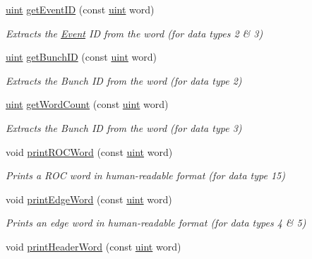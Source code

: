 \begin{DoxyCompactItemize}
\hyperlink{namespacebindec_a61700e6ffcfc677215bfdf223803e735}{uint} \hyperlink{namespacebindec_a7164db2f87d4d2cfa12b2cd147d2402d}{get\+Event\+ID} (const \hyperlink{namespacebindec_a61700e6ffcfc677215bfdf223803e735}{uint} word)
\begin{DoxyCompactList}\small\item\em Extracts the \hyperlink{class_event}{Event} ID from the word (for data types 2 \& 3) \end{DoxyCompactList}\item 
\hyperlink{namespacebindec_a61700e6ffcfc677215bfdf223803e735}{uint} \hyperlink{namespacebindec_ad029aeb7b485d578e5f3ce91a9cf85f6}{get\+Bunch\+ID} (const \hyperlink{namespacebindec_a61700e6ffcfc677215bfdf223803e735}{uint} word)
\begin{DoxyCompactList}\small\item\em Extracts the Bunch ID from the word (for data type 2) \end{DoxyCompactList}\item 
\hyperlink{namespacebindec_a61700e6ffcfc677215bfdf223803e735}{uint} \hyperlink{namespacebindec_a41cf9d8a7714d845128193f21a9e8947}{get\+Word\+Count} (const \hyperlink{namespacebindec_a61700e6ffcfc677215bfdf223803e735}{uint} word)
\begin{DoxyCompactList}\small\item\em Extracts the Bunch ID from the word (for data type 3) \end{DoxyCompactList}\item 
void \hyperlink{namespacebindec_ae47ffd422cb9936f6dfca77bc7c969cb}{print\+R\+O\+C\+Word} (const \hyperlink{namespacebindec_a61700e6ffcfc677215bfdf223803e735}{uint} word)
\begin{DoxyCompactList}\small\item\em Prints a R\+OC word in human-\/readable format (for data type 15) \end{DoxyCompactList}\item 
void \hyperlink{namespacebindec_a54d919f57f0eaa9df57df4b0ad8cdfc6}{print\+Edge\+Word} (const \hyperlink{namespacebindec_a61700e6ffcfc677215bfdf223803e735}{uint} word)
\begin{DoxyCompactList}\small\item\em Prints an edge word in human-\/readable format (for data types 4 \& 5) \end{DoxyCompactList}\item 
void \hyperlink{namespacebindec_a185046fdda824c32d42f246df1f1bbba}{print\+Header\+Word} (const \hyperlink{namespacebindec_a61700e6ffcfc677215bfdf223803e735}{uint} word)

\end{DoxyCompactItemize}
